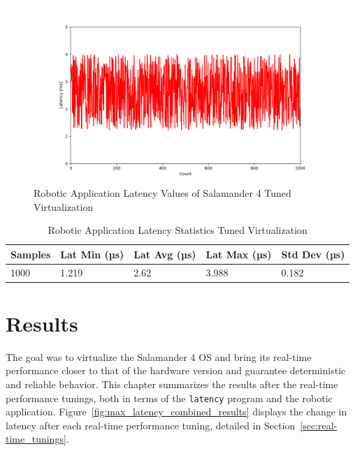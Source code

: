 \documentclass[MMR,Master,english]{style/twbook}
\begin{document}
\begin{figure}[H]
	\centering
	\includegraphics[width=1.0\columnwidth]{img/implementation/tuned_virt_latencies.png}
	\caption[Robotic Application Latency Values of Salamander 4 Tuned Virtualization]{Robotic Application Latency Values of Salamander 4 Tuned Virtualization}
	\label{fig:tuned_virt_latencies}
\end{figure}
\begin{table}[H]
	\centering
	\caption{Robotic Application Latency Statistics Tuned Virtualization}
	\label{tab:robotic_application_latency_values_virt_tun}
	\setlength{\tabcolsep}{0.5em} %
	{\renewcommand{\arraystretch}{1.2}%
		\begin{tabular}{|l|l|l|l|l|}
			\hline
			\textbf{Samples} & \textbf{Lat Min (µs)} & \textbf{Lat Avg (µs)} & \textbf{Lat Max (µs)} & \textbf{Std Dev (µs)} \\ \hline
			1000             & 1.219                 & 2.62                  & 3.988                 & 0.182                 \\ \hline
		\end{tabular}}
\end{table}

\clearpage

\chapter{Results}\label{cha:results}
The goal was to virtualize the Salamander 4 OS and bring its real-time performance closer to that of the hardware version and guarantee deterministic and reliable behavior. This chapter summarizes the results after the real-time performance tunings, both in terms of the \texttt{latency} program and the robotic application. Figure~\ref{fig:max_latency_combined_results} displays the change in latency after each real-time performance tuning, detailed in Section~\ref{sec:real-time_tunings}.
\end{document}
